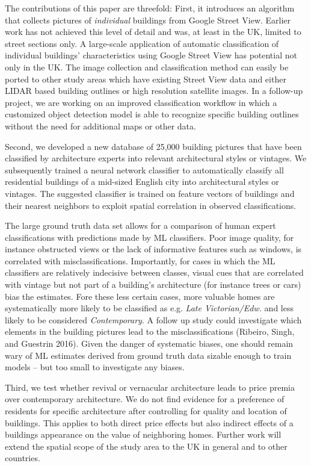 \documentclass[]{article}
\begin{document}
The contributions of this paper are threefold: First, it introduces an
algorithm that collects pictures of \emph{individual} buildings from
Google Street View. Earlier work has not achieved this level of detail
and was, at least in the UK, limited to street sections only. A
large-scale application of automatic classification of individual
buildings' characteristics using Google Street View has potential not
only in the UK. The image collection and classification method can
easily be ported to other study areas which have existing Street View
data and either LIDAR based building outlines or high resolution
satellite images. In a follow-up project, we are working on an improved
classification workflow in which a customized object detection model is
able to recognize specific building outlines without the need for
additional maps or other data.

Second, we developed a new database of 25,000 building pictures that
have been classified by architecture experts into relevant architectural
styles or vintages. We subsequently trained a neural network classifier
to automatically classify all residential buildings of a mid-sized
English city into architectural styles or vintages. The suggested
classifier is trained on feature vectors of buildings and their nearest
neighbors to exploit spatial correlation in observed classifications.

The large ground truth data set allows for a comparison of human expert
classifications with predictions made by ML classifiers. Poor image
quality, for instance obstructed views or the lack of informative
features such as windows, is correlated with misclassifications.
Importantly, for cases in which the ML classifiers are relatively
indecisive between classes, visual cues that are correlated with vintage
but not part of a building's architecture (for instance trees or cars)
bias the estimates. Fore these less certain cases, more valuable homes
are systematically more likely to be classified as e.g. \emph{Late
Victorian/Edw.} and less likely to be considered \emph{Contemporary}. A
follow up study could investigate which elements in the building
pictures lead to the misclassifications (Ribeiro, Singh, and Guestrin
2016). Given the danger of systematic biases, one should remain wary of
ML estimates derived from ground truth data sizable enough to train
models -- but too small to investigate any biases.

Third, we test whether revival or vernacular architecture leads to price
premia over contemporary architecture. We do not find evidence for a
preference of residents for specific architecture after controlling for
quality and location of buildings. This applies to both direct price
effects but also indirect effects of a buildings appearance on the value
of neighboring homes. Further work will extend the spatial scope of the
study area to the UK in general and to other countries.
\end{document}
